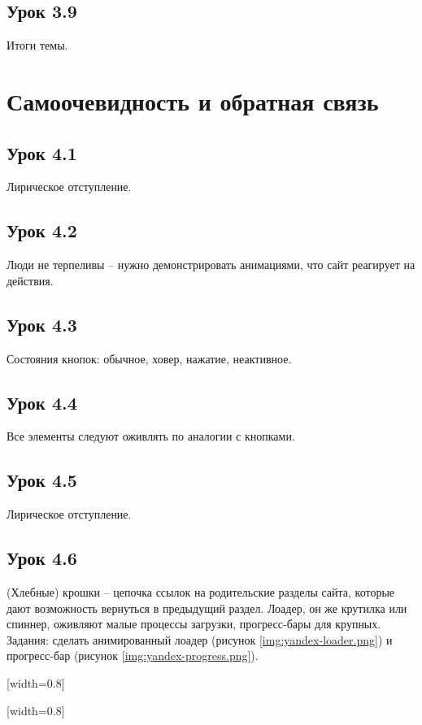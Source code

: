 \documentclass[variant=practice]{bsuir}
\begin{document}
\subsection{Урок 3.9} Итоги темы.

\section{Самоочевидность и обратная связь}

\subsection{Урок 4.1} Лирическое отступление.

\subsection{Урок 4.2} Люди не терпеливы -- нужно демонстрировать анимациями, что
сайт реагирует на действия.

\subsection{Урок 4.3} Состояния кнопок: обычное, ховер, нажатие, неактивное.

\subsection{Урок 4.4} Все элементы следуют оживлять по аналогии с кнопками.

\subsection{Урок 4.5} Лирическое отступление.

\subsection{Урок 4.6} (Хлебные) крошки -- цепочка ссылок на родительские разделы
сайта, которые дают возможность вернуться в предыдущий раздел. Лоадер, он же
крутилка или спиннер, оживляют малые процессы загрузки, прогресс-бары для
крупных. Задания: сделать анимированный лоадер (рисунок
\ref{img:yandex-loader.png}) и прогресс-бар (рисунок
\ref{img:yandex-progress.png}).

[width=0.8\textwidth]

[width=0.8\textwidth]
\end{document}
